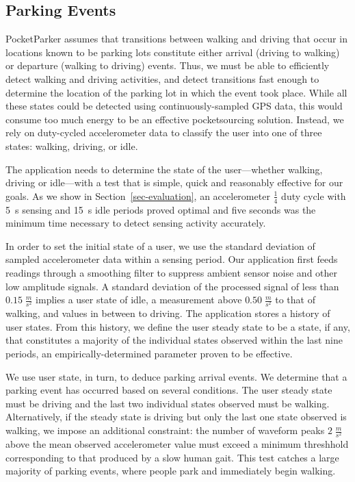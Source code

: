 \subsection{Parking Events}
\label{subsec-goals}

PocketParker assumes that transitions between walking and driving that occur
in locations known to be parking lots constitute either arrival (driving to
walking) or departure (walking to driving) events. Thus, we must be able to
efficiently detect walking and driving activities, and detect transitions
fast enough to determine the location of the parking lot in which the event
took place. While all these states could be detected using
continuously-sampled GPS data, this would consume too much energy to be an
effective pocketsourcing solution. Instead, we rely on duty-cycled
accelerometer data to classify the user into one of three states: walking,
driving, or idle.

The application needs to determine the state of the user---whether walking,
driving or idle---with a test that is simple, quick and reasonably effective
for our goals. As we show in Section~\ref{sec-evaluation}, an accelerometer
$\frac{1}{4}$ duty cycle with 5~s sensing and 15~s idle periods proved
optimal and five seconds was the minimum time necessary to detect sensing
activity accurately.

In order to set the initial state of a user, we use the standard deviation of
sampled accelerometer data within a sensing period. Our application first
feeds readings through a smoothing filter to suppress ambient sensor noise
and other low amplitude signals. A standard deviation of the processed signal
of less than $0.15\;\frac{m}{s^2}$ implies a user state of idle, a
measurement above $0.50\;\frac{m}{s^2}$ to that of walking, and values in
between to driving. The application stores a history of user states. From
this history, we define the user steady state to be a state, if any, that
constitutes a majority of the individual states observed within the last nine
periods, an empirically-determined parameter proven to be effective.

We use user state, in turn, to deduce parking arrival events. We determine
that a parking event has occurred based on several conditions. The user
steady state must be driving and the last two individual states observed must
be walking. Alternatively, if the steady state is driving but only the last
one state observed is walking, we impose an additional constraint: the number
of waveform peaks $2\;\frac{m}{s^2}$ above the mean observed accelerometer
value must exceed a minimum threshhold corresponding to that produced by a
slow human gait.  This test catches a large majority of parking events, where
people park and immediately begin walking.

